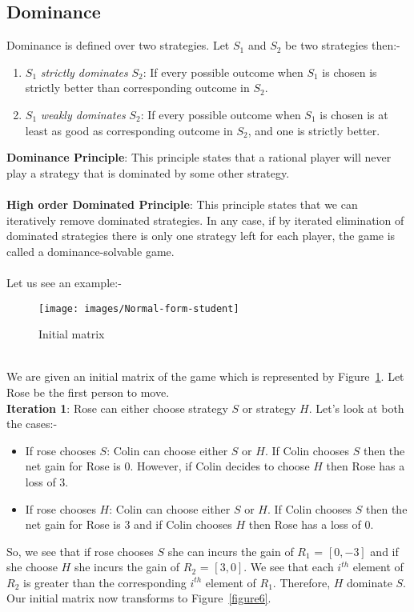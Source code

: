 \subsection{Dominance}
Dominance is defined over two strategies. Let $S_1$ and $S_2$ be two strategies then:-
\begin{enumerate}
    \item $S_1$ \textit{strictly dominates} $S_2$: If every possible outcome when $S_1$ is chosen is strictly better than corresponding outcome in $S_2$.
    \item $S_1$ \textit{weakly dominates} $S_2$: If every possible outcome when $S_1$ is chosen is at least as good as corresponding outcome in $S_2$, and one is strictly better.
\end{enumerate}
\textbf{Dominance Principle}: This principle states that a rational player will never play a strategy that is dominated by some other strategy.\\\\
\textbf{High order Dominated Principle}: This principle states that we can iteratively remove dominated strategies. In any case, if by iterated elimination of dominated strategies there is only one strategy left for each player, the game is called a dominance-solvable game.\\\\
Let us see an example:-\\
\begin{figure}[h!]
\centering
\texttt{[image: images/Normal-form-student]}
\caption{Initial matrix}
\label{figure5}
\end{figure}\\
We are given an initial matrix of the game which is represented by Figure~\ref{figure5}. Let Rose be the first person to move.\\
\textbf{Iteration 1}: Rose can either choose strategy $S$ or strategy $H$. Let's look at both the cases:-\\
\begin{itemize}
    \item If rose chooses $S$: Colin can choose either $S$ or $H$. If Colin chooses $S$ then the net gain for Rose is $0$. However, if Colin decides to choose $H$ then Rose has a loss of 3.
    \item If rose chooses $H$: Colin can choose either $S$ or $H$. If Colin chooses $S$ then the net gain for Rose is $3$ and if Colin chooses $H$ then Rose has a loss of 0.
\end{itemize}
So, we see that if rose chooses $S$ she can incurs the gain of $R_1$ = $[0, -3]$ and if she choose $H$ she incurs the gain of $R_2$ = $[3, 0]$. We see that each $i^{th}$ element of $R_2$ is greater than the corresponding $i^{th}$ element of $R_1$. Therefore, $H$ dominate $S$. Our initial matrix now transforms to Figure~\ref{figure6}.
